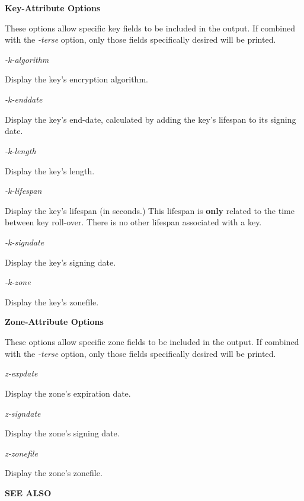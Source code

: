 {\bf Key-Attribute Options}

These options allow specific key fields to be included in the output.  If
combined with the {\it -terse} option, only those fields specifically desired
will be printed.

\begin{description}

\item {\it -k-algorithm}\verb" "

Display the key's encryption algorithm.

\item {\it -k-enddate}\verb" "

Display the key's end-date, calculated by adding the key's lifespan to its
signing date.

\item {\it -k-length}\verb" "

Display the key's length.

\item {\it -k-lifespan}\verb" "

Display the key's lifespan (in seconds.) This lifespan is {\bf only} related
to the time between key roll-over.  There is no other lifespan associated with
a key.

\item {\it -k-signdate}\verb" "

Display the key's signing date.

\item {\it -k-zone}\verb" "

Display the key's zonefile.

\end{description}

{\bf Zone-Attribute Options}

These options allow specific zone fields to be included in the output.  If
combined with the {\it -terse} option, only those fields specifically desired
will be printed.

\begin{description}

\item {\it z-expdate}\verb" "

Display the zone's expiration date.

\item {\it z-signdate}\verb" "

Display the zone's signing date.

\item {\it z-zonefile}\verb" "

Display the zone's zonefile.

\end{description}

{\bf SEE ALSO}



